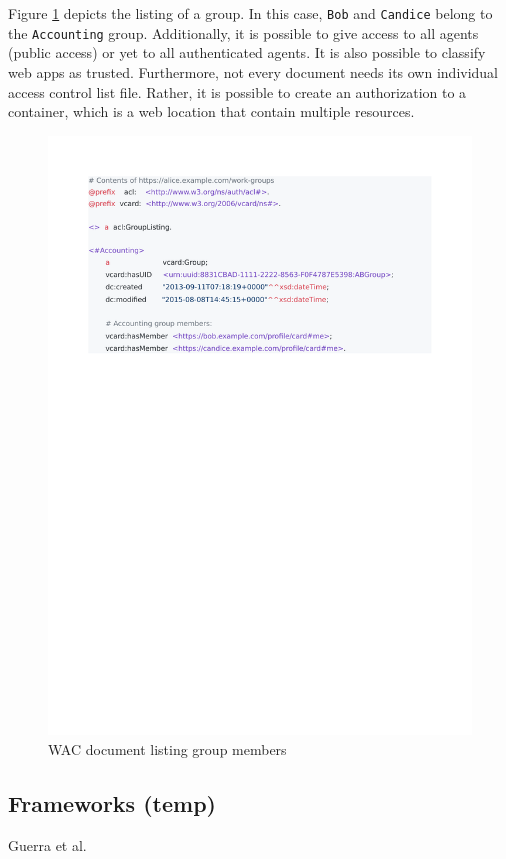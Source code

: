 \documentclass[sigconf]{acmart}
\def\code#1{\texttt{#1}}
\begin{document}
Figure \ref{fig:group-listing} depicts the listing of a group. In this case, \code{Bob} and \code{Candice} belong to the \code{Accounting} group. Additionally, it is possible to give access to all agents (public access) or yet to all authenticated agents. It is also possible to classify web apps as trusted. Furthermore, not every document needs its own individual access control list file. Rather, it is possible to create an authorization to a container, which is a web location that contain multiple resources.

\begin{figure}
  \includegraphics[trim=2cm 19cm 4.7cm 2cm, clip, scale=0.57]{pdf/work-groups}
  \caption{WAC document listing group members}
  \label{fig:group-listing}
\end{figure}


\subsection{Frameworks (temp)}
Guerra et al. \cite{Guerra2015}
\end{document}
